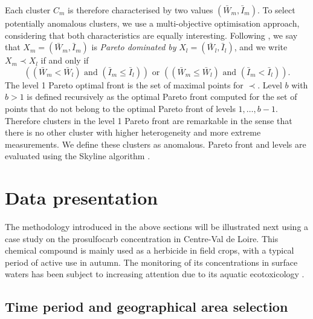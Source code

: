 Each cluster $C_m$ is therefore characterised by two values $(\bar{W}_m, \bar{I}_m)$. To select potentially anomalous clusters, we use a multi-objective optimisation approach, considering that both characteristics are equally interesting. Following \cite{KIELING2002311}, we say that  $X_m = (\bar{W}_m, \bar{I}_m)$ is \emph{Pareto dominated by} $X_l = (\bar{W}_l,\bar{I}_l)$, and we write $X_m \prec X_l$ if and only if
\begin{equation*}
    \left((\bar{W}_m<\bar{W}_l)\text{ and }(\bar{I}_m\leq \bar{I}_l)\right)
    \text{ or }\left((\bar{W}_m \leq \bar{W}_l)\text{ and }(\bar{I}_m < \bar{I}_l)\right).
\end{equation*}
The level 1 Pareto optimal front is the set of maximal points for $\prec$. Level $b$ with $b>1$ is defined recursively as the optimal Pareto front computed for the set of points that do not belong to the optimal Pareto front of levels $1,\ldots,b-1$. Therefore clusters in the level 1 Pareto front are remarkable in the sense that there is no other cluster with higher heterogeneity and more extreme measurements. We define these clusters as anomalous. Pareto front and levels are evaluated using the Skyline algorithm \cite{914855,endres2015scalagon}. 

\section{Data presentation}\label{section:data}

The methodology introduced in the above sections will be illustrated next using a case study on the prosulfocarb  concentration \cite{Prosulfocarb:NIH:url} in Centre-Val de Loire. This chemical compound is mainly used as a herbicide in field crops, with a typical period of active use in autumn. The monitoring of its concentrations in surface waters has been subject to increasing attention due to its aquatic ecotoxicology \cite{PPV,Prosulfocarb:PPDB}.

\subsection{Time period and geographical area selection}
\label{section:data-naiade}

